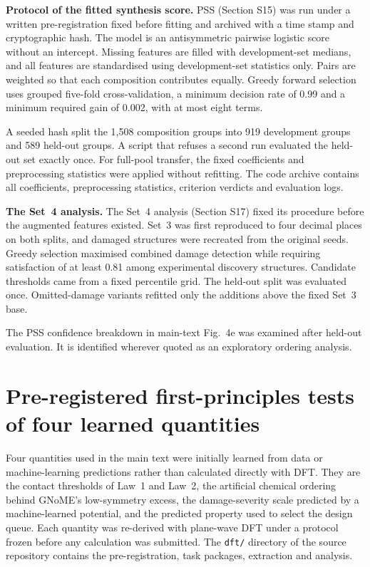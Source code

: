 \textbf{Protocol of the fitted synthesis score.} PSS (Section S15) was run under a written
pre-registration fixed before fitting and archived with a time stamp and cryptographic
hash. The model is an antisymmetric pairwise logistic score without an intercept. Missing
features are filled with development-set medians, and all features are standardised using
development-set statistics only. Pairs are weighted so that each composition contributes
equally. Greedy
forward selection uses grouped five-fold cross-validation, a minimum decision rate of
0.99 and a minimum required gain of 0.002, with at most eight terms.

A seeded hash split the 1{,}508 composition groups into 919 development groups and 589
held-out groups. A script that refuses a second run evaluated the held-out set exactly
once. For full-pool transfer, the fixed coefficients and preprocessing statistics were
applied without refitting. The code archive contains all coefficients, preprocessing
statistics, criterion verdicts and evaluation logs.

\textbf{The Set~4 analysis.} The Set~4 analysis (Section S17) fixed its
procedure before the augmented features existed. Set~3 was first reproduced to four
decimal places on both splits, and damaged structures were recreated from the original
seeds. Greedy selection maximised combined damage detection while requiring satisfaction
of at least 0.81 among experimental discovery structures. Candidate thresholds came from
a fixed percentile grid. The held-out split was evaluated once. Omitted-damage variants
refitted only the additions above the fixed Set~3 base.

The PSS confidence breakdown in main-text Fig.~4e was examined after held-out evaluation.
It is identified wherever quoted as an exploratory ordering analysis.

\section{Pre-registered first-principles tests of four learned quantities}\label{note:dft}

Four quantities used in the main text were initially learned from data or machine-learning
predictions rather than calculated directly with DFT. They are the contact thresholds of Law~1 and Law~2, the artificial chemical ordering behind GNoME's low-symmetry excess,
the damage-severity
scale predicted by a machine-learned potential, and the predicted property used to select
the design queue. Each quantity was re-derived with plane-wave DFT under a protocol frozen
before any calculation was submitted. The \texttt{dft/} directory of the source repository
contains the pre-registration, task packages, extraction and analysis.

